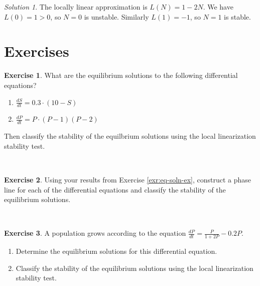 \documentclass[
]{book}
\theoremstyle{definition}
\theoremstyle{definition}
\theoremstyle{definition}
\newtheorem{exercise}{Exercise}[chapter]
\theoremstyle{remark}
\newtheorem*{solution}{Solution}
\begin{document}
\begin{solution}
{}The locally linear approximation is \(L(N) = 1-2N\). We have \(L(0)=1>0\), so \(N=0\) is unstable. Similarly \(L(1)=-1\), so \(N=1\) is stable.
\end{solution}

\newpage

\hypertarget{exercises-4}{%
\section{Exercises}\label{exercises-4}}

\begin{exercise}
\protect\hypertarget{exr:eq-soln-ex}{}{\label{exr:eq-soln-ex} }What are the equilibrium solutions to the following differential equations?

\begin{enumerate}[label=\alph*.]
\item $\displaystyle \frac{dS}{dt} = 0.3 \cdot(10-S)$
\item $\displaystyle \frac{dP}{dt} = P \cdot(P-1)(P-2)$
\end{enumerate}

Then classify the stability of the equilbrium solutions using the local linearization stability test.
\end{exercise}

~
\begin{exercise}
\protect\hypertarget{exr:unnamed-chunk-87}{}{\label{exr:unnamed-chunk-87} }Using your results from Exercise \ref{exr:eq-soln-ex}, construct a phase line for each of the differential equations and classify the stability of the equilibrium solutions.
\end{exercise}
~

\begin{exercise}
\protect\hypertarget{exr:unnamed-chunk-88}{}{\label{exr:unnamed-chunk-88} }A population grows according to the equation \(\displaystyle \frac{dP}{dt} = \frac{P}{1+2P} - 0.2P\).

\begin{enumerate}[label=\alph*.]
\item Determine the equilibrium solutions for this differential equation.
\item Classify the stability of the equilibrium solutions using the local linearization stability test.
\end{enumerate}
\end{exercise}
\end{document}
